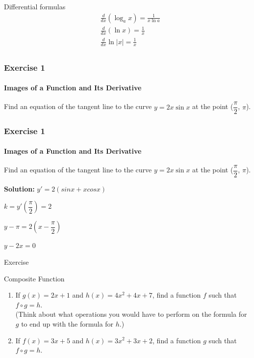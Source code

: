 \begin{frame}{Differential formulas}
    $$
        \begin{aligned}
             & \frac{d}{d x}\left(\log _{a} x\right)=\frac{1}{x \ln a} \\
             & \frac{d}{d x}(\ln x)=\frac{1}{x}                        \\
             & \frac{d}{d x} \ln |x|=\frac{1}{x}                       \\
        \end{aligned}
    $$
\end{frame}



\begin{frame}
    \frametitle{Exercise 1}
    \framesubtitle{Images of a Function and Its Derivative}
    Find an equation of the tangent line to the curve $y = 2x\sin{x}$ at the point ($\dfrac{\pi}{2}$, $\pi$).
\end{frame}



\begin{frame}
    \frametitle{Exercise 1}
    \framesubtitle{Images of a Function and Its Derivative}
    Find an equation of the tangent line to the curve $y = 2x\sin{x}$ at the point ($\dfrac{\pi}{2}$, $\pi$).
    
    \vspace*{1em}
    
    \textbf{Solution:}
    $y' = 2(sinx + xcosx)$
    
    $k = y'(\dfrac{\pi}{2}) = 2$
    
    $y - \pi = 2(x - \dfrac{\pi}{2})$
    
    $ y - 2x = 0$
\end{frame}

\begin{frame}{Exercise}
    \begin{block}{Composite Function}
        \begin{enumerate}
            \item If $g(x)=2 x+1$ and $h(x)=4 x^{2}+4 x+7$, find a function $f$ such that $f \circ g=h$. \\(Think about what operations you would have to perform on the formula for $g$ to end up with the formula for $h$.)\\
            \item If $f(x)=3 x+5$ and $h(x)=3 x^{2}+3 x+2$, find a function $g$ such that $f \circ g=h$.\\
        \end{enumerate}
    \end{block}
\end{frame}



